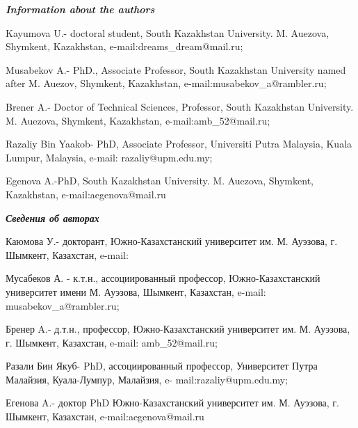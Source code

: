 \begin{authorinfo}
\emph{{\bfseries Information about the authors}}

Kayumova U.- doctoral student, South Kazakhstan University. M. Auezova,
Shymkent, Kazakhstan, e-mail:dreams\_dream@mail.ru;

Musabekov A.- PhD., Associate Professor, South Kazakhstan University
named after M. Auezov, Shymkent, Kazakhstan,
e-mail:musabekov\_a@rambler.ru;

Brener A.- Doctor of Technical Sciences, Professor, South Kazakhstan
University. M. Auezova, Shymkent, Kazakhstan, e-mail:amb\_52@mail.ru;

Razaliy Bin Yaakob- PhD, Associate Professor, Universiti Putra Malaysia,
Kuala Lumpur, Malaysia, e-mail: razaliy@upm.edu.my;

Egenova A.-PhD, South Kazakhstan University. M. Auezova, Shymkent,
Kazakhstan, e-mail:aegenova@mail.ru

\emph{{\bfseries Сведения об авторах}}

Каюмова У.- докторант, Южно-Казахстанский университет им. М. Ауэзова, г.
Шымкент, Казахстан,
e-mail:

Мусабеков А. - к.т.н., ассоциированный профессор, Южно-Казахстанский
университет имени М. Ауэзова, Шымкент, Казахстан, e-mail:
musabekov\_a@rambler.ru;

Бренер A.- д.т.н., профессор, Южно-Казахстанский университет им. М.
Ауэзова, г. Шымкент, Казахстан, e-mail: amb\_52@mail.ru;

Разали Бин Якуб- PhD, ассоциированный профессор, Университет Путра
Малайзия, Куала-Лумпур, Малайзия, e- mail:razaliy@upm.edu.my;

Егенова A.- доктор PhD Южно-Казахстанский университет им. М. Ауэзова, г.
Шымкент, Казахстан, e-mail:aegenova@mail.ru
\end{authorinfo}
